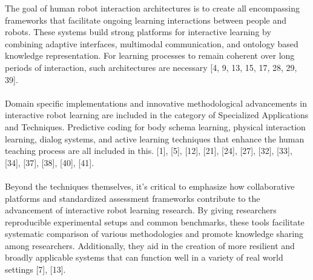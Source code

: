 \documentclass[report.tex]{subfiles}
\begin{document}
 The goal of human robot interaction architectures is to create all encompassing frameworks that facilitate ongoing learning interactions between people and robots.  These systems build strong platforms for interactive learning by combining adaptive interfaces, multimodal communication, and ontology based knowledge representation.  For learning processes to remain coherent over long periods of interaction, such architectures are necessary [4, 9, 13, 15, 17, 28, 29, 39].\\\\
 Domain specific implementations and innovative methodological advancements in interactive robot learning are included in the category of Specialized Applications and Techniques.  Predictive coding for body schema learning, physical interaction learning, dialog systems, and active learning techniques that enhance the human teaching process are all included in this.  [1], [5], [12], [21], [24], [27], [32], [33], [34], [37], [38], [40], [41].\\\\
 Beyond the techniques themselves, it's critical to emphasize how collaborative platforms and standardized assessment frameworks contribute to the advancement of interactive robot learning research.  By giving researchers reproducible experimental setups and common benchmarks, these tools facilitate systematic comparison of various methodologies and promote knowledge sharing among researchers.  Additionally, they aid in the creation of more resilient and broadly applicable systems that can function well in a variety of real world settings [7], [13].
\end{document}
